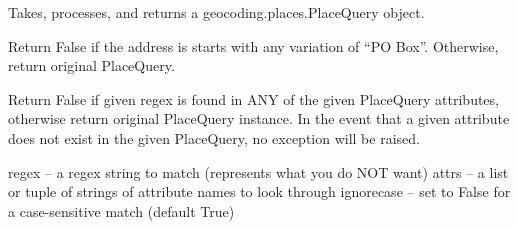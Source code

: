 \documentclass[letterpaper,10pt,english]{sphinxmanual}
\begin{document}

\begin{fulllineitems}
\label{index:omgeo.processors.PreProcessor}
Takes, processes, and returns a geocoding.places.PlaceQuery object.

\end{fulllineitems}

\label{index:module-omgeo.processors.preprocessors}

\begin{fulllineitems}
\label{index:omgeo.processors.preprocessors.CancelIfPOBox}
Return False if the address is starts with any variation of ``PO Box''.
Otherwise, return original PlaceQuery.

\end{fulllineitems}


\begin{fulllineitems}
\label{index:omgeo.processors.preprocessors.CancelIfRegexInAttr}
Return False if given regex is found in ANY of the given
PlaceQuery attributes, otherwise return original PlaceQuery instance.
In the event that a given attribute does not exist in the given
PlaceQuery, no exception will be raised.

regex         -- a regex string to match (represents what you do NOT want)
attrs         -- a list or tuple of strings of attribute names to look through
ignorecase    -- set to False for a case-sensitive match (default True)

\end{fulllineitems}

\end{document}
